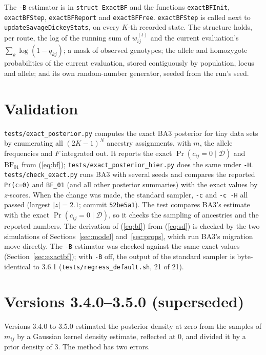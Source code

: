 \documentclass[11pt,a4paper]{article}
\newcommand{\BF}{\mathrm{BF}}
\newcommand{\data}{\mathcal{D}}
\newcommand{\1}{\mathbf{1}}
\begin{document}
The \texttt{-B} estimator is in \texttt{struct ExactBF} and the functions
\texttt{exactBFInit}, \texttt{exactBFStep}, \texttt{exactBFReport} and
\texttt{exactBFFree}. \texttt{exactBFStep} is called next to
\texttt{updateSavageDickeyStats}, on every $K$-th recorded state. The structure
holds, per route, the log of the running sum of $w^{(t)}_{ij}$ and the
current evaluation's $\sum_k\log(1-q_{kj})$; a mask of observed genotypes; the
allele and homozygote probabilities of the current evaluation, stored
contiguously by population, locus and allele; and its own random-number
generator, seeded from the run's seed.

\section{Validation}
\label{sec:validation}

\texttt{tests/exact\_posterior.py} computes the exact BA3 posterior for tiny data
sets by enumerating all $(2K-1)^{N}$ ancestry assignments, with $m$, the allele
frequencies and $F$ integrated out. It reports the exact
$\Pr(c_{ij}=0\mid\data)$ and $\BF_{01}$ from (\ref{eq:bf});
\texttt{tests/exact\_posterior\_hier.py} does the same under \texttt{-H}.
\texttt{tests/check\_exact.py} runs BA3 with several seeds and compares the
reported \texttt{Pr(c=0)} and \texttt{BF\_01} (and all other posterior summaries)
with the exact values by $z$-scores. When the change was made, the standard
sampler, \texttt{-c} and \texttt{-c -H} all passed (largest $|z|=2.1$; commit
\texttt{52be5a1}). The test
compares BA3's estimate with the exact $\Pr(c_{ij}=0\mid\data)$, so it checks
the sampling of ancestries and the reported numbers. The derivation of
(\ref{eq:bf}) from (\ref{eq:sd}) is checked by the two simulations of
Sections~\ref{sec:model} and~\ref{sec:props}, which run BA3's migration move
directly. The \texttt{-B} estimator was checked against the same exact values
(Section~\ref{sec:exactbf}); with \texttt{-B} off, the output of the standard
sampler is byte-identical to 3.6.1 (\texttt{tests/regress\_default.sh}, 21 of 21).

\section{Versions 3.4.0--3.5.0 (superseded)}
\label{sec:old}

Versions 3.4.0 to 3.5.0 estimated the posterior density at zero from the
samples of $m_{ij}$ by a Gaussian kernel density estimate, reflected at $0$,
and divided it by a prior density of $3$. The method has two errors.
\end{document}
